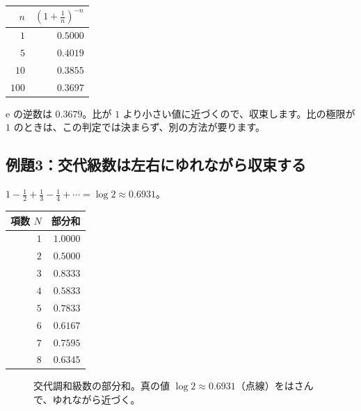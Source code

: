 \documentclass[a4paper,11pt,openany]{ltjsbook}
\newcommand{\ee}{\mathrm{e}}
\begin{document}
\begin{center}
\begin{tabular}{rr}
\toprule
$n$ & $\left(1+\frac1n\right)^{-n}$\\
\midrule
$1$ & $0.5000$\\
$5$ & $0.4019$\\
$10$ & $0.3855$\\
$100$ & $0.3697$\\
\bottomrule
\end{tabular}
\end{center}

$\ee$ の逆数は $0.3679$。比が $1$ より小さい値に近づくので、収束します。比の極限が $1$ のときは、この判定では決まらず、別の方法が要ります。

\subsection*{例題3：交代級数は左右にゆれながら収束する}

$1-\frac12+\frac13-\frac14+\cdots=\log2\approx0.6931$。

\begin{center}
\begin{tabular}{rr}
\toprule
項数 $N$ & 部分和\\
\midrule
$1$ & $1.0000$\\
$2$ & $0.5000$\\
$3$ & $0.8333$\\
$4$ & $0.5833$\\
$5$ & $0.7833$\\
$6$ & $0.6167$\\
$7$ & $0.7595$\\
$8$ & $0.6345$\\
\bottomrule
\end{tabular}
\end{center}

\begin{figure}[htbp]
\centering
{}
\caption{交代調和級数の部分和。真の値 $\log2\approx0.6931$（点線）をはさんで、ゆれながら近づく。}
\end{figure}
\end{document}
